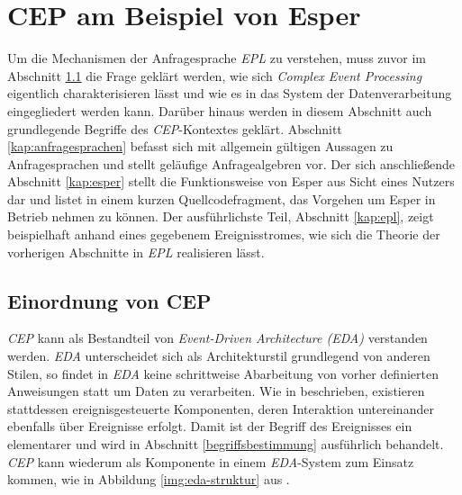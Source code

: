 \documentclass{acm_proc_article-sp}
\begin{document}
%
%

\section{CEP am Beispiel von Esper}
\vspace{0.1cm}

Um die Mechanismen der Anfragesprache \textit{EPL} zu verstehen, muss zuvor im Abschnitt 
\ref{kap:einordnung} die Frage 
geklärt werden, wie sich \textit{Complex Event Processing} eigentlich charakterisieren 
lässt und wie es in das System der Datenverarbeitung eingegliedert werden kann. Darüber 
hinaus werden in diesem Abschnitt auch grundlegende Begriffe des \textit{CEP}-Kontextes 
geklärt. Abschnitt \ref{kap:anfragesprachen} befasst sich mit allgemein gültigen Aussagen 
zu Anfragesprachen und stellt geläufige Anfragealgebren vor. Der sich anschließende 
Abschnitt \ref{kap:esper} stellt die Funktionsweise von Esper aus Sicht eines Nutzers dar 
und listet in einem kurzen Quellcodefragment, das Vorgehen um Esper in Betrieb nehmen zu 
können. Der ausführlichste Teil, Abschnitt \ref{kap:epl}, zeigt beispielhaft anhand eines 
gegebenem Ereignisstromes, wie sich die Theorie der vorherigen Abschnitte in 
\textit{EPL} realisieren lässt.


\subsection{Einordnung von CEP}\label{kap:einordnung}
\vspace{0.1cm}
\textit{CEP} kann als Bestandteil von \textit{Event-Driven Architecture (EDA)} verstanden 
werden. \textit{EDA} unterscheidet sich als Architekturstil 
grundlegend von anderen Stilen, so findet in \textit{EDA} keine schrittweise Abarbeitung 
von vorher definierten Anweisungen statt um Daten zu verarbeiten. Wie in \cite{glossary} 
beschrieben, existieren stattdessen ereignisgesteuerte Komponenten, deren Interaktion 
untereinander ebenfalls über Ereignisse erfolgt. Damit ist der Begriff des Ereignisses 
ein elementarer und wird in Abschnitt \ref{begriffsbestimmung} ausführlich behandelt. 
\textit{CEP} kann wiederum als Komponente in einem \textit{EDA}-System zum Einsatz 
kommen, wie in Abbildung \ref{img:eda-struktur} aus \cite{bruns}.
\end{document}
